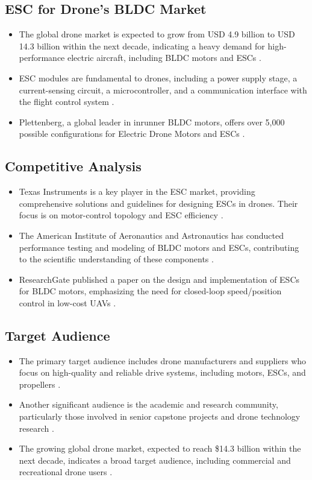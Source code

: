\documentclass[12pt]{article}
\begin{document}
	\subsection{ESC for Drone's BLDC Market}
		\begin{itemize}
			\item The global drone market is expected to grow from USD 4.9 billion to USD 14.3 billion within the next decade, indicating a heavy demand for high-performance electric aircraft, including BLDC motors and ESCs \cite{umd}.
			\item ESC modules are fundamental to drones, including a power supply stage, a current-sensing circuit, a microcontroller, and a communication interface with the flight control system \cite{powerelectronicsnews}.
			\item Plettenberg, a global leader in inrunner BLDC motors, offers over 5,000 possible configurations for Electric Drone Motors and ESCs \cite{plettenberg}.
		\end{itemize}
	
	\subsection{Competitive Analysis}
		\begin{itemize}
			\item Texas Instruments is a key player in the ESC market, providing comprehensive solutions and guidelines for designing ESCs in drones. Their focus is on motor-control topology and ESC efficiency \cite{ti}.
			\item The American Institute of Aeronautics and Astronautics has conducted performance testing and modeling of BLDC motors and ESCs, contributing to the scientific understanding of these components \cite{aiaa}.
			\item ResearchGate published a paper on the design and implementation of ESCs for BLDC motors, emphasizing the need for closed-loop speed/position control in low-cost UAVs \cite{researchgate}.
		\end{itemize}
	
	  \subsection{Target Audience}
		\begin{itemize}
			\item The primary target audience includes drone manufacturers and suppliers who focus on high-quality and reliable drive systems, including motors, ESCs, and propellers \cite{drive-tech}.
			\item Another significant audience is the academic and research community, particularly those involved in senior capstone projects and drone technology research \cite{tufts}.
			\item The growing global drone market, expected to reach \$14.3 billion within the next decade, indicates a broad target audience, including commercial and recreational drone users \cite{umd}.
		\end{itemize}
	
\end{document}
